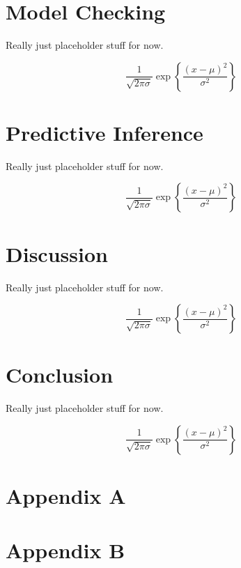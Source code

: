 \documentclass[
]{article}
\begin{document}
\hypertarget{model-checking}{%
\section{Model Checking}\label{model-checking}}

Really just placeholder stuff for now.

\[
\frac{1}{\sqrt{2\pi\sigma}} \exp{\left\lbrace \frac{(x-\mu)^2}{\sigma^2} \right\rbrace}
\]

\hypertarget{predictive-inference}{%
\section{Predictive Inference}\label{predictive-inference}}

Really just placeholder stuff for now.

\[
\frac{1}{\sqrt{2\pi\sigma}} \exp{\left\lbrace \frac{(x-\mu)^2}{\sigma^2} \right\rbrace}
\]

\hypertarget{discussion}{%
\section{Discussion}\label{discussion}}

Really just placeholder stuff for now.

\[
\frac{1}{\sqrt{2\pi\sigma}} \exp{\left\lbrace \frac{(x-\mu)^2}{\sigma^2} \right\rbrace}
\]

\hypertarget{conclusion}{%
\section{Conclusion}\label{conclusion}}

Really just placeholder stuff for now.

\[
\frac{1}{\sqrt{2\pi\sigma}} \exp{\left\lbrace \frac{(x-\mu)^2}{\sigma^2} \right\rbrace}
\]

\hypertarget{appendix-a}{%
\section*{Appendix A}\label{appendix-a}}


\hypertarget{appendix-b}{%
\section*{Appendix B}\label{appendix-b}}


  
\end{document}
